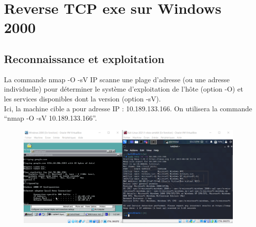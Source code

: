 \documentclass[12pt, oneside]{article}
\begin{document}
\section{Reverse TCP exe sur Windows 2000}
\subsection{Reconnaissance et exploitation}
La commande nmap -O -sV IP scanne une plage d’adresse (ou une adresse individuelle) pour déterminer le système d’exploitation de l’hôte (option -O) et les services disponibles dont la version (option -sV).\\
Ici, la machine cible a pour adresse IP : 10.189.133.166. On utilisera la commande “nmap -O -sV 10.189.133.166”.
\begin{figure}[H]
\centering
\includegraphics[scale=0.4]{Image1}
\end{figure}
\end{document}
